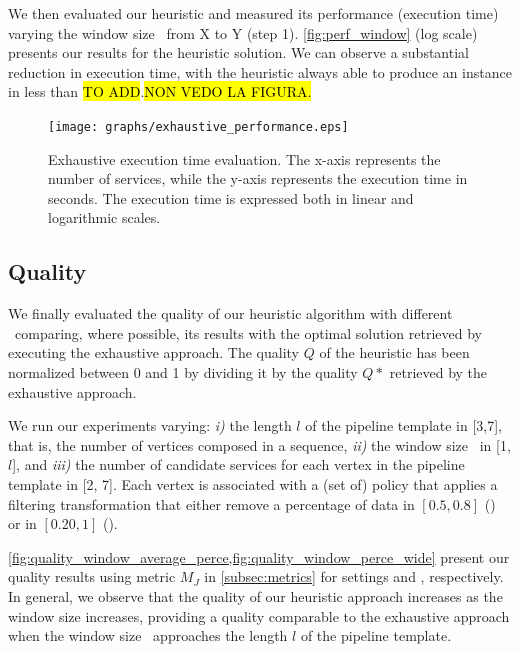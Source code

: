 We then evaluated our heuristic and measured its performance (execution time) varying the window size \windowsize\ from X to Y (step 1). \cref{fig:perf_window} (log scale) presents our results for the heuristic solution. We can observe a substantial reduction in execution time, with the heuristic always able to produce an instance in less than \hl{TO ADD}.\hl{NON VEDO LA FIGURA.}
\begin{figure}[htb!]
  \texttt{[image: graphs/exhaustive\_performance.eps]}
  \caption{Exhaustive execution time evaluation. The x-axis represents the number of services, while the y-axis represents the execution time in seconds. The execution time is expressed both in linear and logarithmic scales.}
  \label{fig:perf_exhaustive}
\end{figure}


\subsection{Quality}\label{subsec:experiments_quality}
We finally evaluated the quality of our heuristic algorithm with different \windowsize\ comparing, where possible, its results with the optimal solution retrieved by executing the exhaustive approach. %
The quality $Q$ of the heuristic has been normalized between 0 and 1 by dividing it by the quality $Q*$ retrieved by the exhaustive approach.


We run our experiments varying: \emph{i)} the length $l$ of the pipeline template in [3,7], that is, the number of vertices composed in a sequence, \emph{ii)} the window size \windowsize\ in [1,$l$], and \emph{iii)} the number of candidate services for each vertex in the pipeline template in [2, 7]. Each vertex is associated with a (set of) policy that applies a filtering transformation that either remove a percentage of data in $[0.5,0.8]$ (\average) or in $[0.20,1]$ (\wide).

\cref{fig:quality_window_average_perce,fig:quality_window_perce_wide} present our quality results using metric $M_J$ in \cref{subsec:metrics} for settings \wide and \average, respectively.
In general, we observe that the quality of our heuristic approach increases as the window size increases, providing a quality comparable to the exhaustive approach when the window size \windowsize\ approaches the length $l$ of the pipeline template.

